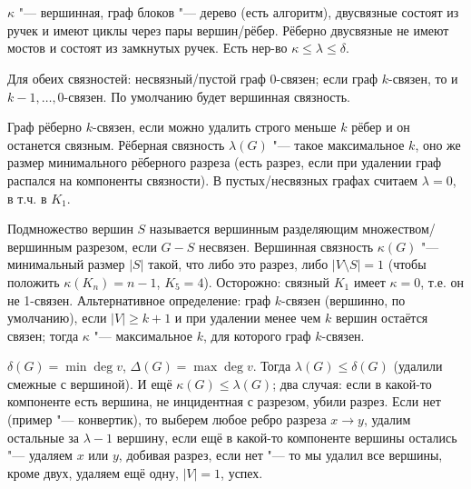 \section{} %
	$\kappa$ "--- вершинная, граф блоков "--- дерево (есть алгоритм), двусвязные состоят из ручек и имеют циклы через пары вершин/рёбер.
	Рёберно двусвязные не имеют мостов и состоят из замкнутых ручек.
	Есть нер-во $\kappa \le \lambda \le \delta$.

	Для обеих связностей:
	несвязный/пустой граф 0-связен;
	если граф $k$-связен, то и $k-1, \dots, 0$-связен.
	По умолчанию будет вершинная связность.

	Граф рёберно $k$-связен, если можно удалить строго меньше $k$ рёбер и он останется связным.
	Рёберная связность $\lambda(G)$ "--- такое максимальное $k$, оно же
	размер минимального рёберного разреза (есть разрез, если при удалении граф распался на компоненты связности).
	В пустых/несвязных графах считаем $\lambda=0$, в т.ч. в $K_1$.

	Подмножество вершин $S$ называется вершинным разделяющим множеством/вершинным разрезом,
	если $G-S$ несвязен.
	Вершинная связность $\kappa(G)$ "--- минимальный размер $|S|$ такой, что либо это разрез,
	либо $|V\setminus S|=1$ (чтобы положить $\kappa(K_n)=n-1$, $K_5=4$).
	Осторожно: связный $K_1$ имеет $\kappa=0$, т.е. он не 1-связен.
	Альтернативное определение: граф $k$-связен (вершинно, по умолчанию), если $|V|\ge k+1$
	и при удалении менее чем $k$ вершин остаётся связен;
	тогда $\kappa$ "--- максимальное $k$, для которого граф $k$-связен.

	$\delta(G) = \min \deg v$, $\Delta(G) = \max\deg v$.
	Тогда $\lambda(G)\le\delta(G)$ (удалили смежные с вершиной).
	И ещё $\kappa(G)\le \lambda(G)$; два случая: если в какой-то компоненте есть вершина,
	не инцидентная с разрезом, убили разрез.
	Если нет (пример "--- конвертик), то выберем любое ребро разреза $x \to y$,
	удалим остальные за $\lambda-1$ вершину, если ещё в какой-то компоненте вершины остались "--- удаляем $x$ или $y$, добивая разрез,
	если нет "--- то мы удалил все вершины, кроме двух, удаляем ещё одну, $|V|=1$, успех.

